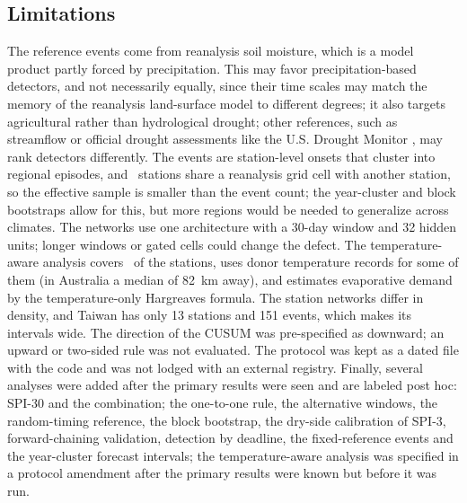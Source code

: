 \documentclass[pdflatex,sn-mathphys-ay]{sn-jnl}
\theoremstyle{thmstyletwo}
\begin{document}
\subsection{Limitations}\label{sec:limits}
The reference events come from reanalysis soil moisture, which is a model product partly forced by
precipitation. This may favor precipitation-based detectors, and not necessarily equally, since their
time scales may match the memory of the reanalysis land-surface model to different degrees; it also
targets agricultural rather than hydrological drought; other references, such as streamflow or official
drought assessments like the U.S. Drought Monitor \citep{svoboda2002}, may rank detectors differently.
The events are station-level onsets that cluster into regional episodes, and \nsharecell\ stations share
a reanalysis grid cell with another station, so the effective sample is smaller than the event count; the year-cluster and block bootstraps allow for this, but more regions
would be needed to generalize across climates. The networks use one architecture with a 30-day window
and 32 hidden units; longer windows or gated cells could change the defect. The temperature-aware
analysis covers \mvnst\ of the stations, uses donor temperature records for some of them (in Australia a
median of 82~km away), and estimates evaporative demand by the temperature-only Hargreaves formula. The
station networks differ in density, and Taiwan has only 13 stations and 151 events, which makes its
intervals wide. The direction of the CUSUM was pre-specified as downward; an upward or two-sided rule was
not evaluated. The protocol was kept as a dated file with the code and was not lodged with an external
registry. Finally, several analyses were added after the primary results were seen and are labeled post
hoc: SPI-30 and the combination; the one-to-one rule, the alternative windows, the random-timing
reference, the block bootstrap, the dry-side calibration of SPI-3, forward-chaining validation, detection
by deadline, the fixed-reference events and the year-cluster forecast intervals; the
temperature-aware analysis was specified in a protocol amendment after the primary results were known
but before it was run.
\end{document}
